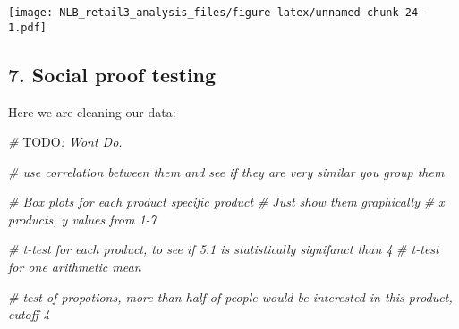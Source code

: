 \documentclass[
]{article}
\newenvironment{Shaded}{\begin{snugshade}}{\end{snugshade}}
\newcommand{\AlertTok}[1]{\textcolor[rgb]{0.94,0.16,0.16}{#1}}
\newcommand{\AttributeTok}[1]{\textcolor[rgb]{0.77,0.63,0.00}{#1}}
\newcommand{\CommentTok}[1]{\textcolor[rgb]{0.56,0.35,0.01}{\textit{#1}}}
\newcommand{\DecValTok}[1]{\textcolor[rgb]{0.00,0.00,0.81}{#1}}
\newcommand{\FunctionTok}[1]{\textcolor[rgb]{0.00,0.00,0.00}{#1}}
\newcommand{\NormalTok}[1]{#1}
\newcommand{\OtherTok}[1]{\textcolor[rgb]{0.56,0.35,0.01}{#1}}
\newcommand{\SpecialCharTok}[1]{\textcolor[rgb]{0.00,0.00,0.00}{#1}}
\newcommand{\StringTok}[1]{\textcolor[rgb]{0.31,0.60,0.02}{#1}}
\begin{document}
\begin{Shaded}
\end{Shaded}

\texttt{[image: NLB\_retail3\_analysis\_files/figure-latex/unnamed-chunk-24-1.pdf]}

\begin{Shaded}
\end{Shaded}

\hypertarget{social-proof-testing}{%
\subsection{7. Social proof testing}\label{social-proof-testing}}

Here we are cleaning our data:

\begin{Shaded}
\begin{Highlighting}[]
\CommentTok{\# }\AlertTok{TODO}\CommentTok{: Wont Do.}

\CommentTok{\# use correlation between them and see if they are very similar you group them}

\CommentTok{\# Box plots for each product specific product}
\CommentTok{\# Just show them graphically}
\CommentTok{\# x products, y values from 1{-}7}

\CommentTok{\# t{-}test for each product, to see if 5.1 is statistically signifanct than 4}
\CommentTok{\# t{-}test for one arithmetic mean}

\CommentTok{\# test of propotions, more than half of people would be interested in this product, cutoff 4}
\end{Highlighting}
\end{Shaded}
\end{document}
